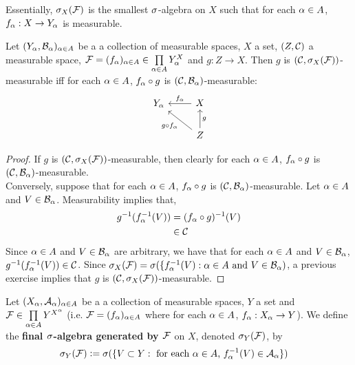 \documentclass{book}
\begin{document}
	\begin{note}
		Essentially, $\sigma_X(\mathcal{F})$ is the smallest $\sigma$-algebra on $X$ such that for each $\alpha \in A$, $f_{\alpha}:X \rightarrow Y_{\alpha}$ is measurable. 
	\end{note}

	\begin{ex} 
		Let $(Y_{\alpha}, \mathcal{B}_{\alpha})_{\alpha \in A}$ be a a collection of measurable spaces, $X$ a set, $(Z, \mathcal{C})$ a measurable space, $\mathcal{F} = (f_{\alpha})_{\alpha \in A} \in \prod \limits_{\alpha \in A}Y_{\alpha}^X$ and $g: Z \rightarrow X$. Then $g$ is $(\mathcal{C}, \sigma_X(\mathcal{F}))$-measurable iff for each $\alpha \in A$, $f_{\alpha} \circ g$ is $(\mathcal{C}, \mathcal{B}_{\alpha})$-measurable:
		\[ \begin{tikzcd}
			Y_{\al}	
			& X  \arrow[l, "f_{\al}"'] \\
			& Z \arrow[ul, "g \circ f_{\al}"]  \arrow[u, "g"']
		\end{tikzcd}
		\]
	\end{ex}
	
	\begin{proof}
		If $g$ is $(\mathcal{C}, \sigma_X(\mathcal{F}))$-measurable, then clearly for each $\alpha \in A$, $ f_{\alpha} \circ g$ is $(\mathcal{C}, \mathcal{B}_{\alpha})$-measurable. \\
		Conversely, suppose that for each $\alpha \in A$, $f_{\alpha} \circ g$ is $(\mathcal{C}, \mathcal{B}_{\alpha})$-measurable. Let $\alpha \in A$ and $V \in \mathcal{B}_{\alpha}$. Measurability implies that,
		\begin{align*}
			g^{-1}(f_{\alpha}^{-1}(V)) 
			& = (f_{\alpha} \circ g)^{-1}(V) \\
			& \in \mathcal{C}
		\end{align*}
		Since $\alpha \in A$ and $V \in \mathcal{B}_{\alpha}$ are arbitrary, we have that for each $\alpha \in A$ and $V \in \mathcal{B}_{\alpha}$, $g^{-1}(f_{\alpha}^{-1}(V)) \in \mathcal{C}$. Since $\sigma_X(\mathcal{F}) = \sigma(\{f_{\alpha}^{-1}(V): \alpha \in A \text{ and } V \in \mathcal{B}_{\alpha})$, a previous exercise implies that $g$ is $(\mathcal{C}, \sigma_X(\mathcal{F}))$-measurable.
	\end{proof}
	
	\begin{defn} 
		Let $(X_{\alpha}, \mathcal{A}_{\alpha})_{\alpha \in A}$ be a a collection of measurable spaces, $Y$ a set and $\mathcal{F} \in \prod \limits_{\alpha \in A}Y^{X^{\alpha}}$ (i.e. $\mathcal{F} = (f_{\alpha})_{\alpha \in A}$ where for each $\alpha \in A$, $f_{\alpha}:X_{\alpha} \rightarrow Y$). We define the \textbf{final $\sigma$-algebra generated by $\mathcal{F}$} on $X$, denoted $\sigma_Y(\mathcal{F})$, by 
		\begin{align*}
			\sigma_Y(\mathcal{F}) 
			& \vcentcolon= \sigma(\{V \subset Y: \text{ for each $\alpha \in A$, $f_{\alpha}^{-1}(V) \in \mathcal{A}_{\alpha}$}\})
		\end{align*}	 
	\end{defn}
	
\end{document}
